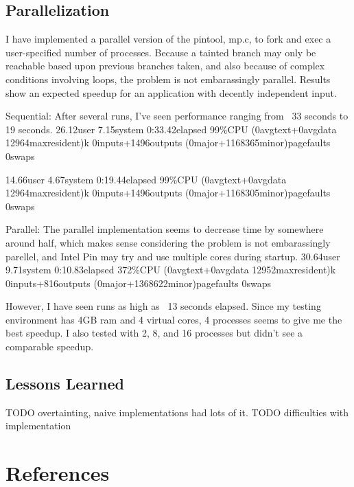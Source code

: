 \documentclass[11pt,expanded,copyright]{fsuthesis}
\begin{document}
\section{Parallelization}

I have implemented a parallel version of the pintool, mp.c, to fork and exec a user-specified number of processes. Because a tainted branch may only be reachable based upon previous branches taken, and also because of complex conditions involving loops, the problem is not embarassingly parallel. Results show an expected speedup for an application with decently independent input.

Sequential:
After several runs, I've seen performance ranging from ~33 seconds to 19 seconds.
26.12user 7.15system 0:33.42elapsed 99\%CPU (0avgtext+0avgdata 12964maxresident)k
0inputs+1496outputs (0major+1168365minor)pagefaults 0swaps

14.66user 4.67system 0:19.44elapsed 99\%CPU (0avgtext+0avgdata 12964maxresident)k
0inputs+1496outputs (0major+1168305minor)pagefaults 0swaps

Parallel:
The parallel implementation seems to decrease time by somewhere around half, which makes sense considering the problem is not embarassingly parellel, and Intel Pin may try and use multiple cores during startup.
30.64user 9.71system 0:10.83elapsed 372\%CPU (0avgtext+0avgdata 12952maxresident)k
0inputs+816outputs (0major+1368622minor)pagefaults 0swaps

However, I have seen runs as high as ~13 seconds elapsed. Since my testing environment has 4GB ram and 4 virtual cores, 4 processes seems to give me the best speedup. I also tested with 2, 8, and 16 processes but didn't see a comparable speedup.

%

\section{Lessons Learned}

TODO overtainting, naive implementations had lots of it.
TODO difficulties with implementation

\chapter{References}
\end{document}
